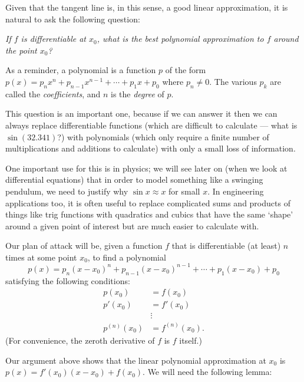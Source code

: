 Given that the tangent line is, in this sense, a good linear approximation, it is natural to ask the following question:
\begin{center}\itshape
  If $ f $ is differentiable at $ x_0 $, what is the best polynomial approximation to $ f $ around the point $ x_0 $?
\end{center}

As a reminder, a polynomial is a function $ p $ of the form $ p(x) = p_n x^n + p_{n - 1} x^{n - 1} + \cdots + p_1 x + p_0 $
where $ p_n \neq 0 $. The various $ p_k $ are called the \emph{coefficients}, and $ n $ is the \emph{degree} of $ p $.

This question is an important one, because if we can answer it then we can always replace differentiable functions (which
are difficult to calculate --- what is $ \sin(32.341) $?) with polynomials (which only require a finite number of multiplications
and additions to calculate) with only a small loss of information.

One important use for this is in physics; we will see later on (when we look at differential equations) that in order to
model something like a swinging pendulum, we need to justify why $ \sin x \approx x $ for small $ x $. In engineering
applications too, it is often useful to replace complicated sums and products of things like trig functions with quadratics
and cubics that have the same `shape' around a given point of interest but are much easier to calculate with.

Our plan of attack will be, given a function $ f $ that is differentiable (at least) $ n $ times at some point $ x_0 $,
to find a polynomial
\begin{displaymath}
  p(x) = p_n (x - x_0)^n + p_{n - 1} (x - x_0)^{n -1} + \cdots + p_1 (x - x_0) + p_0
\end{displaymath}
satisfying the following conditions:
\begin{align*}
  p(x_0) &= f(x_0)\\
  p'(x_0) &= f'(x_0)\\
  &\vdots\\
  p^{(n)}(x_0) &= f^{(n)}(x_0).
\end{align*}
(For convenience, the zeroth derivative of $ f $ is $ f $ itself.)

Our argument above shows that the linear polynomial approximation at $ x_0 $ is $ p(x) = f'(x_0)(x - x_0) + f(x_0) $. We will need the following lemma:

